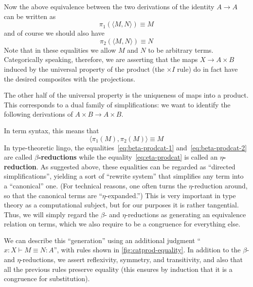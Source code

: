 \documentclass{book}
\let\types\vdash
\def\timesI{\mathord{\times}I}
\def\pair#1#2{\langle #1,#2\rangle}
\begin{document}
Now the above equivalence between the two derivations of the identity $A\to A$ can be written as
\begin{equation}
  \pi_1(\pair M N) \equiv M\label{eq:beta-prodcat-1}
\end{equation}
and of course we should also have
\begin{equation}
  \pi_2(\pair M N) \equiv N\label{eq:beta-prodcat-2}
\end{equation}
Note that in these equalities we allow $M$ and $N$ to be arbitrary terms.
Categorically speaking, therefore, we are asserting that the maps $X\to A\times B$ induced by the universal property of the product (the $\timesI$ rule) do in fact have the desired composites with the projections.

The other half of the universal property is the uniqueness of maps into a product.
This corresponds to a dual family of simplifications: we want to identify the following derivations of $A\times B\to A\times B$.
In term syntax, this means that
\begin{equation}
  \pair{\pi_1(M)}{\pi_2(M)} \equiv M\label{eq:eta-prodcat}
\end{equation}
In type-theoretic lingo, the equalities~\eqref{eq:beta-prodcat-1} and~\eqref{eq:beta-prodcat-2} are called \textbf{$\beta$-reductions} while the equality~\eqref{eq:eta-prodcat} is called an \textbf{$\eta$-reduction}.
As suggested above, these equalities can be regarded as ``directed simplifications'', yielding a sort of ``rewrite system'' that simplifies any term into a ``canonical'' one.
(For technical reasons, one often turns the $\eta$-reduction around, so that the canonical terms are ``$\eta$-expanded.'')
This is very important in type theory as a computational subject, but for our purposes it is rather tangential.
Thus, we will simply regard the $\beta$- and $\eta$-reductions as generating an equivalence relation on terms, which we also require to be a congruence for everything else.

We can describe this ``generation'' using an additional judgment ``$x:X\types M\equiv N :A$'', with rules shown in  \cref{fig:catprod-equality}.
In addition to the $\beta$- and $\eta$-reductions, we assert reflexivity, symmetry, and transitivity, and also that all the previous rules preserve equality (this ensures by induction that it is a congruence for substitution).
\end{document}
